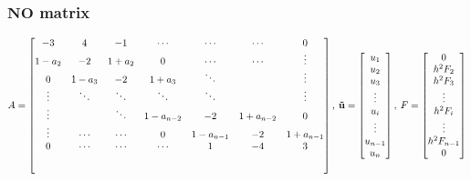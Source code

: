 \subsubsection{$\mathbf{NO}$ matrix}
\setlength{\extrarowheight}{1.25\baselineskip}
\begin{equation}
A=
\begin{bmatrix}
-3 & 4 & -1 & \cdots & \cdots & \cdots & 0\\
1-a_2 & -2 & 1+a_2 & 0 & \cdots & \cdots & \vdots\\
0 & 1-a_3 & -2 & 1+a_3 & \ddots & & \vdots\\
\vdots & \ddots & \ddots & \ddots & \ddots & & \vdots\\
\vdots & & \ddots & 1-a_{n-2} & -2 & 1+a_{n-2} & 0\\
\vdots & \cdots & \cdots & 0 & 1-a_{n-1} & -2 & 1+a_{n-1}\\
0 & \cdots & \cdots & \cdots & 1 & -4 & 3\\[5ex]
\end{bmatrix},\:
\mathbf{\vec{u}}=
\begin{bmatrix}
u_1\\
u_2\\
u_3\\
\vdots\\
u_i\\
\vdots\\
u_{n - 1}\\
u_n
\end{bmatrix},\:
F=
\begin{bmatrix}
0\\
h^2F_2\\
h^2F_3\\
\vdots\\
h^2F_i\\
\vdots\\
h^2F_{n-1}\\
0
\end{bmatrix}
\end{equation}